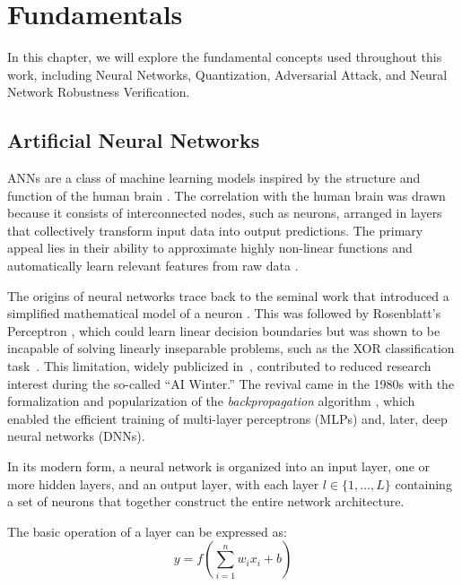 \chapter{Fundamentals} \label{chap:fundamentos}
In this chapter, we will explore the fundamental concepts used throughout this work, including Neural Networks, Quantization, Adversarial Attack, and Neural Network Robustness Verification.

\section{Artificial Neural Networks}
\label{sec:nn}

ANNs are a class of machine learning models inspired by the structure and function of the human brain \cite{mcculloch1943logical}. The correlation with the human brain was drawn because it consists of interconnected nodes, such as neurons, arranged in layers that collectively transform input data into output predictions. The primary appeal lies in their ability to approximate highly non-linear functions and automatically learn relevant features from raw data \cite{goodfellow2016deep}.

The origins of neural networks trace back to the seminal work that introduced a simplified mathematical model of a neuron \cite{mcculloch1943logical}. This was followed by Rosenblatt's Perceptron \cite{Rosenblatt1958}, which could learn linear decision boundaries but was shown to be incapable of solving linearly inseparable problems, such as the XOR classification task~\cite{minsky1969perceptrons}. This limitation, widely publicized in~\cite{minsky1969perceptrons}, contributed to reduced research interest during the so-called ``AI Winter.'' The revival came in the 1980s with the formalization and popularization of the \textit{backpropagation} algorithm \cite{werbos1974beyond,rumelhart1986learning}, which enabled the efficient training of multi-layer perceptrons (MLPs) and, later, deep neural networks (DNNs).

In its modern form, a neural network is organized into an input layer, one or more hidden layers, and an output layer, with each layer $l \in \{1, \dots, L\}$ containing a set of neurons that together construct the entire network architecture.

The basic operation of a layer can be expressed as:
\begin{equation}
y = f\left(\sum_{i=1}^{n} w_i x_i + b\right)
\end{equation}

